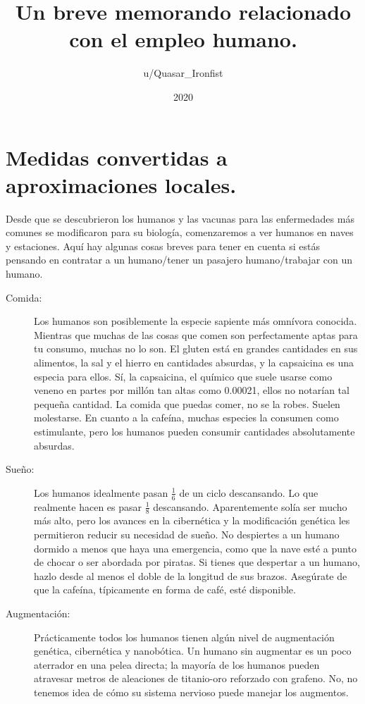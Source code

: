 \documentclass[spanish,12pt,a4paper, oneside]{book}
\title{Un breve memorando relacionado con el empleo humano.}
\author{u/Quasar\_Ironfist}
\date{2020}
\begin{document}
    \maketitle

    \chapter*{Medidas convertidas a aproximaciones locales.}

    Desde que se descubrieron los humanos y las vacunas para las enfermedades más comunes se modificaron para su biología, comenzaremos a ver humanos en naves y estaciones. Aquí hay algunas cosas breves para tener en cuenta si estás pensando en contratar a un humano/tener un pasajero humano/trabajar con un humano.

    \begin{description}
        \item[Comida:] Los humanos son posiblemente la especie sapiente más omnívora conocida. Mientras que muchas de las cosas que comen son perfectamente aptas para tu consumo, muchas no lo son. El gluten está en grandes cantidades en sus alimentos, la sal y el hierro en cantidades absurdas, y la capsaicina es una especia para ellos. Sí, la capsaicina, el químico que suele usarse como veneno en partes por millón tan altas como 0.00021, ellos no notarían tal pequeña cantidad. La comida que puedas comer, no se la robes. Suelen molestarse. En cuanto a la cafeína, muchas especies la consumen como estimulante, pero los humanos pueden consumir cantidades absolutamente absurdas.

        \item[Sueño:] Los humanos idealmente pasan $\frac{1}{6}$ de un ciclo descansando. Lo que realmente hacen es pasar $\frac{1}{8}$ descansando. Aparentemente solía ser mucho más alto, pero los avances en la cibernética y la modificación genética les permitieron reducir su necesidad de sueño. No despiertes a un humano dormido a menos que haya una emergencia, como que la nave esté a punto de chocar o ser abordada por piratas. Si tienes que despertar a un humano, hazlo desde al menos el doble de la longitud de sus brazos. Asegúrate de que la cafeína, típicamente en forma de café, esté disponible.

        \item[Augmentación:] Prácticamente todos los humanos tienen algún nivel de augmentación genética, cibernética y nanobótica. Un humano sin augmentar es un poco aterrador en una pelea directa; la mayoría de los humanos pueden atravesar metros de aleaciones de titanio-oro reforzado con grafeno. No, no tenemos idea de cómo su sistema nervioso puede manejar los augmentos.


\end{description}
\end{document}
